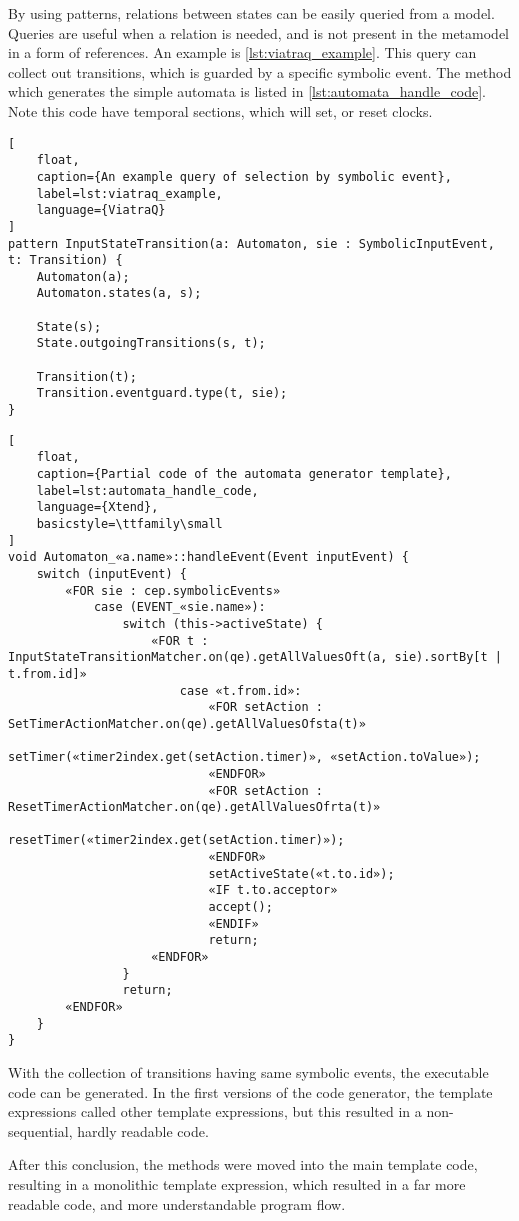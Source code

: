 By using \viatraq{} patterns, relations between states can be easily queried from a model. Queries are useful when a relation is needed, and is not present in the metamodel in a form of references. An example is \cref{lst:viatraq_example}. This query can collect out transitions, which is guarded by a specific symbolic event. The method which generates the simple automata is listed in \cref{lst:automata_handle_code}. Note this code have temporal sections, which will set, or reset clocks.

\begin{lstlisting}[
	float,
	caption={An example query of selection by symbolic event},
	label=lst:viatraq_example,
	language={ViatraQ}
]
pattern InputStateTransition(a: Automaton, sie : SymbolicInputEvent, t: Transition) {
	Automaton(a);
	Automaton.states(a, s);

	State(s);
	State.outgoingTransitions(s, t);

	Transition(t);
	Transition.eventguard.type(t, sie);
}
\end{lstlisting}

\begin{lstlisting}[
	float,
	caption={Partial code of the automata generator template},
	label=lst:automata_handle_code,
	language={Xtend},
	basicstyle=\ttfamily\small
]
void Automaton_«a.name»::handleEvent(Event inputEvent) {
	switch (inputEvent) {
		«FOR sie : cep.symbolicEvents»
			case (EVENT_«sie.name»):
				switch (this->activeState) {
					«FOR t : InputStateTransitionMatcher.on(qe).getAllValuesOft(a, sie).sortBy[t | t.from.id]»
						case «t.from.id»:
							«FOR setAction : SetTimerActionMatcher.on(qe).getAllValuesOfsta(t)»
								setTimer(«timer2index.get(setAction.timer)», «setAction.toValue»);
							«ENDFOR»
							«FOR setAction : ResetTimerActionMatcher.on(qe).getAllValuesOfrta(t)»
								resetTimer(«timer2index.get(setAction.timer)»);
							«ENDFOR»
							setActiveState(«t.to.id»);
							«IF t.to.acceptor»
							accept();
							«ENDIF»
							return;
					«ENDFOR»
				}
				return;
		«ENDFOR»
	}
}
\end{lstlisting}

With the collection of transitions having same symbolic events, the executable \cpp{} code can be generated. In the first versions of the code generator, the template expressions called other template expressions, but this resulted in a non-sequential, hardly readable code.

After this conclusion, the methods were moved into the main template code, resulting in a monolithic template expression, which resulted in a far more readable code, and more understandable program flow.

